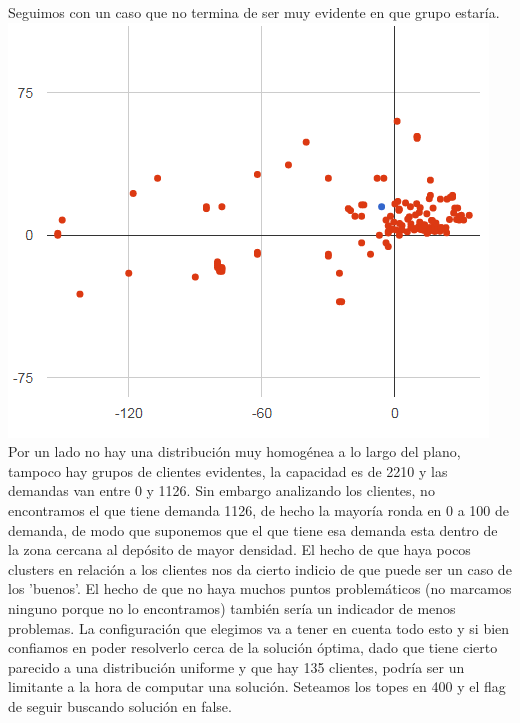 \documentclass[11pt,a4paper]{article}
\begin{document}
\bigskip

Seguimos con un caso que no termina de ser muy evidente en que grupo estaría.
\includegraphics[scale=.5]{graficos/F-n135-k7/prev.png}
\\Por un lado no hay una distribución muy homogénea a lo largo del plano, tampoco hay grupos de clientes evidentes, la capacidad es de 2210 y las demandas van entre 0 y 1126. Sin embargo analizando los clientes, no encontramos el que tiene demanda 1126, de hecho la mayoría ronda en 0 a 100 de demanda, de modo que suponemos que el que tiene esa demanda esta dentro de la zona cercana al depósito de mayor densidad. El hecho de que haya pocos clusters en relación a los clientes nos da cierto indicio de que puede ser un caso de los 'buenos'. El hecho de que no haya muchos puntos problemáticos (no marcamos ninguno porque no lo encontramos) también sería un indicador de menos problemas. La configuración que elegimos va a tener en cuenta todo esto y si bien confiamos en poder resolverlo cerca de la solución óptima, dado que tiene cierto parecido a una distribución uniforme y que hay 135 clientes, podría ser un limitante a la hora de computar una solución. Seteamos los topes en 400 y el flag de seguir buscando solución en false.
\end{document}
